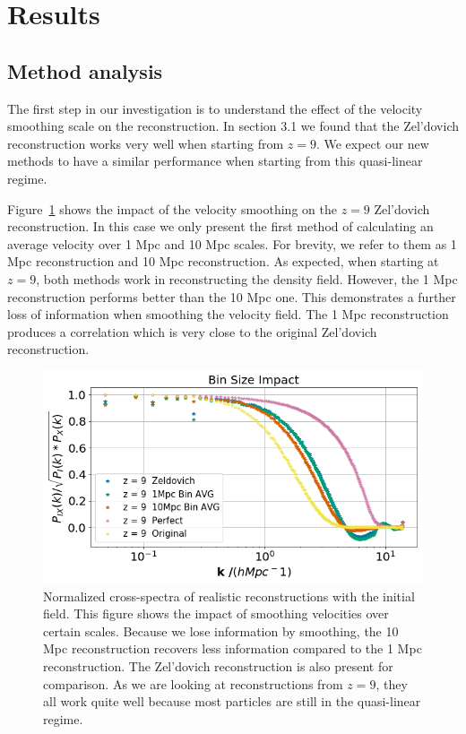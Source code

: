 \section{Results}

\subsection{Method analysis}
The first step in our investigation is to understand the effect of the velocity smoothing scale on the reconstruction. In section 3.1 we found that the Zel'dovich reconstruction works very well when starting from $z=9$. We expect our new methods to have a similar performance when starting from this quasi-linear regime. 

Figure~\ref{fig:4.2} shows the impact of the velocity smoothing on the $z=9$ Zel'dovich reconstruction. In this case we only present the first method of calculating an average velocity over 1 Mpc and 10 Mpc scales. For brevity, we refer to them as 1 Mpc reconstruction and 10 Mpc reconstruction. As expected, when starting at $z=9$, both methods work in reconstructing the density field. However, the 1 Mpc reconstruction performs better than the 10 Mpc one. This demonstrates a further loss of information when smoothing the velocity field. The 1 Mpc reconstruction produces a correlation which is very close to the original Zel'dovich reconstruction.

\begin{figure}
    \centering
    \includegraphics[width=1\columnwidth]{images/realRecon/binSize.png}%
    
    \caption{
    Normalized cross-spectra of realistic reconstructions with the initial field. This figure shows the impact of smoothing velocities over certain scales. Because we lose information by smoothing, the 10 Mpc reconstruction recovers less information compared to the 1 Mpc reconstruction. The Zel'dovich reconstruction is also present for comparison. As we are looking at reconstructions from $z=9$, they all work quite well because most particles are still in the quasi-linear regime.
    }
    
    \label{fig:4.2}
\end{figure}

